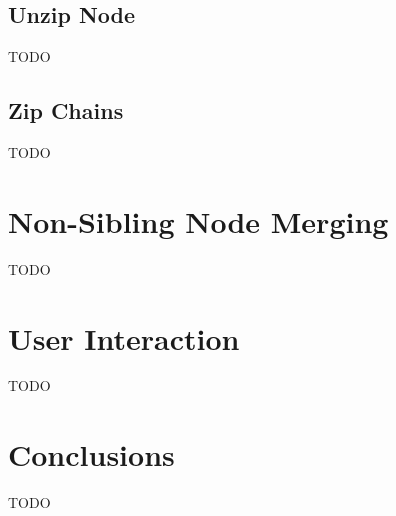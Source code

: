\documentclass[a4paper]{article}
\begin{document}
\subsection{Unzip Node}

TODO

\subsection{Zip Chains}

TODO

\section{Non-Sibling Node Merging}
\label{sec:nsmerge}

TODO

\section{User Interaction}
\label{sec:ui}

TODO

\section{Conclusions}
\label{sec:conclusions}

TODO



\end{document}
